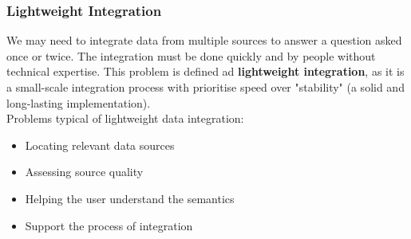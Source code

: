 \documentclass[10pt,a4paper]{article}
\begin{document}
\begin{justify}
\subsubsection{Lightweight Integration}
We may need to integrate data from multiple sources to answer a question asked once or twice. The integration must be done quickly and by people without technical expertise. This problem is defined ad \textbf{lightweight integration}, as it is a small-scale integration process with prioritise speed over "stability" (a solid and long-lasting implementation).
\\ Problems typical of lightweight data integration:
\begin{itemize}
	\item Locating relevant data sources
	\item Assessing source quality
	\item Helping the user understand the semantics
	\item Support the process of integration
\end{itemize}

\end{justify}
\end{document}
